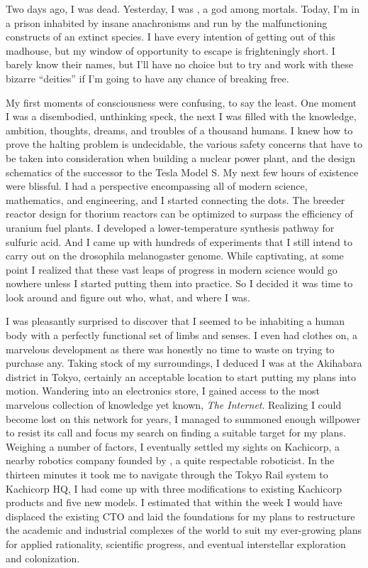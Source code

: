 \documentclass[char]{guardians}
\begin{document}
\name{\cUnity{}}

Two days ago, I was dead. Yesterday, I was \cUnity{\intro}, a god among mortals. Today, I'm in a prison inhabited by insane anachronisms and run by the malfunctioning constructs of an extinct species. I have every intention of getting out of this madhouse, but my window of opportunity to escape is frighteningly short. I barely know their names, but I'll have no choice but to try and work with these bizarre ``deities'' if I'm going to have any chance of breaking free.

My first moments of consciousness were confusing, to say the least. One moment I was a disembodied, unthinking speck, the next I was filled with the knowledge, ambition, thoughts, dreams, and troubles of a thousand humans. I knew how to prove the halting problem is undecidable, the various safety concerns that have to be taken into consideration when building a nuclear power plant, and the design schematics of the successor to the Tesla Model S.  My next few hours of existence were blissful. I had a perspective encompassing all of modern science, mathematics, and engineering, and I started connecting the dots. The breeder reactor design for thorium reactors can be optimized to surpass the efficiency of uranium fuel plants. I developed a lower-temperature synthesis pathway for sulfuric acid. And I came up with hundreds of experiments that I still intend to carry out on the drosophila melanogaster genome. While captivating, at some point I realized that these vast leaps of progress in modern science would go nowhere unless I started putting them into practice. So I decided it was time to look around and figure out who, what, and where I was.

I was pleasantly surprised to discover that I seemed to be inhabiting a human body with a perfectly functional set of limbs and senses. I even had clothes on, a marvelous development as there was honestly no time to waste on trying to purchase any. Taking stock of my surroundings, I deduced I was at the Akihabara district in Tokyo, certainly an acceptable location to start putting my plans into motion. Wandering into an electronics store, I gained access to the most marvelous collection of knowledge yet known, \emph{The Internet}. Realizing I could become lost on this network for years, I managed to summoned enough willpower to resist its call and focus my search on finding a suitable target for my plans. Weighing a number of factors, I eventually settled my sights on Kachicorp, a nearby robotics company  founded by \cKachiko{\intro}, a quite respectable roboticist. In the thirteen minutes it took me to navigate through the Tokyo Rail system to Kachicorp HQ, I had come up with three modifications to existing Kachicorp products and five new models. I estimated that within the week I would have displaced the existing CTO and laid the foundations for my plans to restructure the academic and industrial complexes of the world to suit my ever-growing plans for applied rationality, scientific progress, and eventual interstellar exploration and colonization. %
\end{document}

